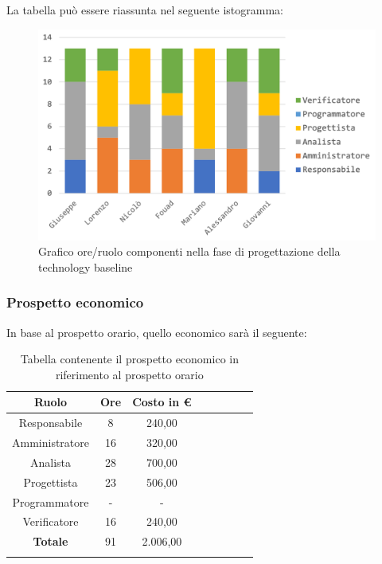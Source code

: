 		La tabella può essere riassunta nel seguente istogramma:
		\begin{figure}[H]
			\centering
			\includegraphics[width=0.8\linewidth]{./images/preventivo/progArch1.png}
			\caption{Grafico ore/ruolo componenti nella fase di progettazione della technology baseline}
			\label{fig:grafico suddivione ruoli fase progettazione della technology baseline}
		\end{figure}
	
		\subsubsection{Prospetto economico}
		In base al prospetto orario, quello economico sarà il seguente: 
		
		\begin{longtable}{|c|c|c|c|c|c|c|c|}
			\hline
			\rowcolor{lighter-grayer}
			\textbf{Ruolo} & \textbf{Ore} & \textbf{Costo in € } \\
			\hline
			\endfirsthead
			
			\hline
			Responsabile 	    & 8 & 240,00\\
			\hline 
			\hline
			Amministratore	  & 16 & 320,00\\
			\hline
			\hline
			Analista 				& 28 & 700,00\\
			\hline
			\hline
			Progettista 		  & 23 & 506,00\\
			\hline
			\hline
			Programmatore 	 & - & -\\
			\hline
			\hline
			Verificatore 		  & 16 & 240,00\\
			\hline
			\textbf{Totale} 	& 91 & 2.006,00\\
			\hline
			\caption{Tabella contenente il prospetto economico in riferimento al prospetto orario}
		\end{longtable}
		\pagebreak
		
